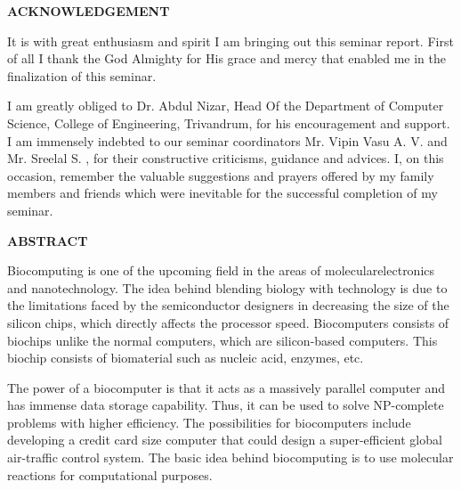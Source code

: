 \newpage
{}
\begin{center}
\bf{{\LARGE ACKNOWLEDGEMENT}}
\end{center}
\begin{Large}
\begin{spacing}{1.1}
\vspace{1cm}
\hspace{2cm}
It is with great enthusiasm and spirit I am bringing out this seminar report. First of all I thank the God Almighty for His grace and mercy that enabled me in the finalization of this seminar.

\hspace{2cm} 
I am greatly obliged to Dr. Abdul Nizar, Head Of the Department of Computer Science,  College of Engineering, Trivandrum, for his encouragement and support. I am immensely indebted to our seminar coordinators Mr. Vipin Vasu A. V. and Mr. Sreelal S. , for their constructive criticisms, guidance and advices. I, on this occasion, remember the valuable suggestions and prayers offered by my family members and friends which were inevitable for the successful completion of my seminar.
\end{spacing}
\end{Large}
\newpage
\begin{center}{\bf{\LARGE ABSTRACT}}
\end{center}
\begin{Large}
\begin{spacing}{1.1}
Biocomputing is one of the upcoming field in the areas of molecularelectronics and nanotechnology. The idea behind blending biology with technology is due to the limitations faced by the semiconductor designers in decreasing the size of the silicon chips, which directly affects the processor speed. Biocomputers consists of biochips unlike the normal computers, which are silicon-based computers. This biochip consists of biomaterial such as nucleic acid, enzymes, etc.

The power of a biocomputer is that it acts as a massively parallel computer and has immense data storage capability. Thus, it can be used to solve NP-complete problems with higher efficiency. The possibilities for biocomputers include developing a credit card size computer that could design a super-efficient global air-traffic control system. The basic idea behind biocomputing is to use molecular reactions for computational purposes.
\end{spacing}
\end{Large}

